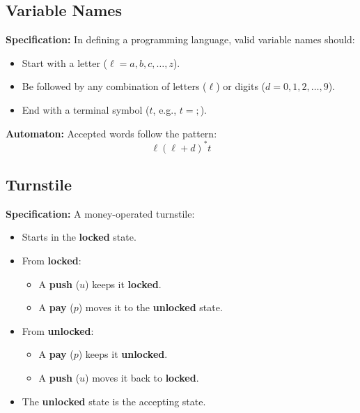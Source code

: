 \documentclass{article}
\begin{document}
\subsection{Variable Names}

\textbf{Specification:} In defining a programming language, valid variable names should:
\begin{itemize}
    \item Start with a letter (\(\ell = a, b, c, \dots, z\)).
    \item Be followed by any combination of letters (\(\ell\)) or digits (\(d = 0,1,2,\dots,9\)).
    \item End with a terminal symbol (\(t\), e.g., \(t = ;\)).
\end{itemize}

\textbf{Automaton:} Accepted words follow the pattern:
\[
\ell (\ell + d)^* t
\]

\subsection{Turnstile}

\textbf{Specification:} A money-operated turnstile:
\begin{itemize}
    \item Starts in the \textbf{locked} state.
    \item From \textbf{locked}:
    \begin{itemize}
        \item A \textbf{push} (\( u \)) keeps it \textbf{locked}.
        \item A \textbf{pay} (\( p \)) moves it to the \textbf{unlocked} state.
    \end{itemize}
    \item From \textbf{unlocked}:
    \begin{itemize}
        \item A \textbf{pay} (\( p \)) keeps it \textbf{unlocked}.
        \item A \textbf{push} (\( u \)) moves it back to \textbf{locked}.
    \end{itemize}
    \item The \textbf{unlocked} state is the accepting state.
\end{itemize}

\begin{center}
\end{center}
\end{document}
